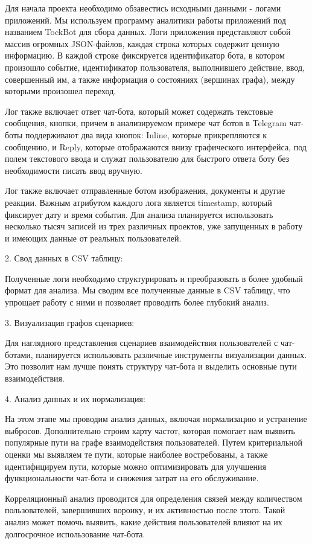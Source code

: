 \documentclass{article}
\begin{document}
Для начала проекта необходимо обзавестись исходными данными - логами приложений. Мы используем программу аналитики работы приложений под названием TockBot для сбора данных. Логи приложения представляют собой массив огромных JSON-файлов, каждая строка которых содержит ценную информацию. В каждой строке фиксируется идентификатор бота, в котором произошло событие, идентификатор пользователя, выполнившего действие, ввод, совершенный им, а также информация о состояниях (вершинах графа), между которыми произошел переход.

Лог также включает ответ чат-бота, который может содержать текстовые сообщения, кнопки, причем в анализируемом примере чат ботов в Telegram чат-боты поддерживают два вида кнопок: Inline, которые прикрепляются к сообщению, и Reply, которые отображаются внизу графического интерфейса, под полем текстового ввода и служат пользователю для быстрого ответа боту без необходимости писать ввод вручную.

Лог также включает отправленные ботом изображения, документы и другие реакции. Важным атрибутом каждого лога является timestamp, который фиксирует дату и время события. Для анализа планируется использовать несколько тысяч записей из трех различных проектов, уже запущенных в работу и имеющих данные от реальных пользователей.

2. Свод данных в CSV таблицу:

Полученные логи необходимо структурировать и преобразовать в более удобный формат для анализа. Мы сводим все полученные данные в CSV таблицу, что упрощает работу с ними и позволяет проводить более глубокий анализ.

3. Визуализация графов сценариев:

Для наглядного представления сценариев взаимодействия пользователей с чат-ботами, планируется использовать различные инструменты визуализации данных. Это позволит нам лучше понять структуру чат-бота и выделить основные пути взаимодействия.

4. Анализ данных и их нормализация:

На этом этапе мы проводим анализ данных, включая нормализацию и устранение выбросов. Дополнительно строим карту частот, которая помогает нам выявить популярные пути на графе взаимодействия пользователей. Путем критериальной оценки мы выявляем те пути, которые наиболее востребованы, а также идентифицируем пути, которые можно оптимизировать для улучшения функциональности чат-бота и снижения затрат на его обслуживание.

Корреляционный анализ проводится для определения связей между количеством пользователей, завершивших воронку, и их активностью после этого. Такой анализ может помочь выявить, какие действия пользователей влияют на их долгосрочное использование чат-бота.
\end{document}
